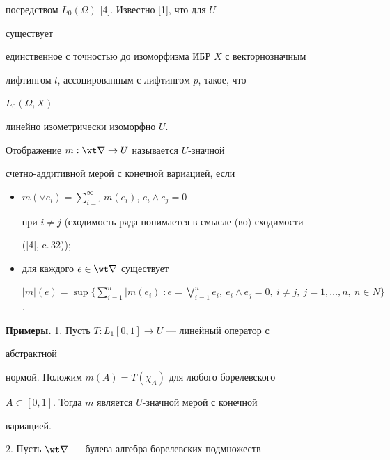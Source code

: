 посредством $L_0(\Omega)$ [4]. Известно [1], что для $U$ 


существует 


единственное с точностью до изоморфизма ИБР $X$ с векторнозначным 


лифтингом $l$, ассоцированным с лифтингом $p$, такое, что 


$L_0(\Omega,X)$ 


линейно изометрически изоморфно $U$. 


 


\begin{defn} Отображение $m:\wt\nabla\to U$ называется $U$-значной  


счетно-аддитивной мерой с конечной вариацией, если 


\begin{itemize} 


\item[1)] $m(\vee e_i)=\sum\limits^\infty_{i=1}m(e_i)$, $e_i\wedge e_j=0$ 


при $i\ne j$ (сходимость ряда понимается в смысле (во)-схо\-ди\-мос\-ти 


([4], c.\,32)); 


\item[2)] для каждого $e\in\wt\nabla$ существует 


$|m|(e)=\sup\Big\{\sum\limits^n_{i=1}|m(e_i)|: 


e=\bigvee\limits^n_{i=1}e_i,\ e_i\wedge e_j=0,\ i\ne j, 


\ j=1,\dotsc,n,\ n\in N\Big\}$. 


\end{itemize} 


\end{defn} 


 


{\bf Примеры.} 1. Пусть $T:L_1[0,1]\to U$ --- линейный оператор с 


абстрактной 


нормой. Положим $m(A)=T(\chi_A)$ для любого борелевского  


$A\subset[0,1]$. Тогда $m$ является $U$-значной мерой с конечной 


вариацией. 


\smallskip 


 


2. Пусть $\wt\nabla$ --- булева алгебра борелевских подмножеств 


